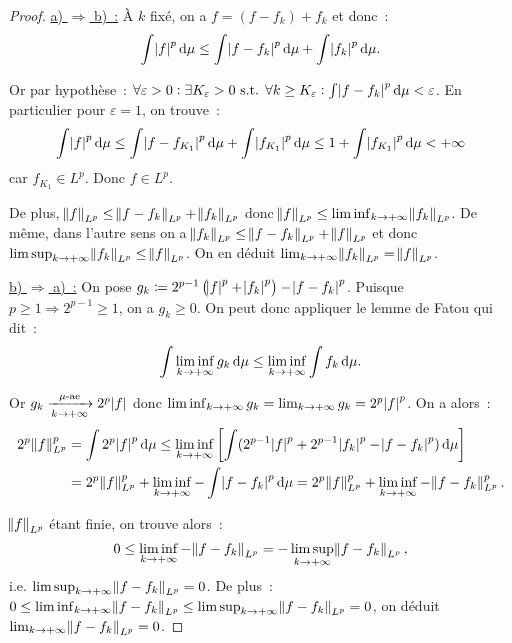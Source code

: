 \documentclass{article}
\theoremstyle{definition}
\newcommand{\pinfty}{{+\infty}}
\newcommand{\st}{\text{ s.t. }}
\begin{document}
\begin{proof} \underline {a) $\Rightarrow$ b)~:} À $k$ fixé, on a $f = (f-f_k) + f_k$ et donc~:
\[\int \abs f^p\dif\mu \leq \int\abs {f-f_k}^p\dif\mu + \int \abs {f_k}^p\dif\mu.\]

Or par hypothèse~: $\forall \varepsilon > 0 : \exists K_\varepsilon > 0 \st \forall k \geq K_\varepsilon : \int \abs {f-f_k}^p\dif\mu < \varepsilon$. En particulier
pour $\varepsilon = 1$, on trouve~:
\[\int \abs f^p\dif\mu \leq \int \abs {f-f_{K_1}}^p\dif\mu + \int\abs {f_{K_1}}^p\dif\mu \leq 1 + \int \abs{f_{K_1}}^p\dif\mu < \pinfty\]
car $f_{K_1} \in L^p$. Donc $f \in L^p$.

De plus, $\norm f_{L^p} \leq \norm {f-f_k}_{L^p} + \norm {f_k}_{L^p}$ donc $\norm f_{L^p} \leq \liminf_{k \to \pinfty}\norm {f_k}_{L^p}$. De même, dans l'autre sens on a
$\norm {f_k}_{L^p} \leq \norm {f-f_k}_{L^p} + \norm f_{L^p}$ et donc $\limsup_{k \to \pinfty}\norm {f_k}_{L^p} \leq \norm f_{L^p}$. On en déduit
$\lim_{k \to \pinfty}\norm {f_k}_{L^p} = \norm f_{L^p}$.

\underline {b) $\Rightarrow$ a)~:} On pose $g_k \coloneqq 2^{p-1}\left(\abs f^p + \abs {f_k}^p\right) - \abs {f-f_k}^p$.
Puisque $p \geq 1 \Rightarrow 2^{p-1} \geq 1$, on a $g_k \geq 0$. On peut donc appliquer le lemme de Fatou qui dit~:
\[\int\liminf_{k \to \pinfty}g_k\dif\mu \leq \liminf_{k \to \pinfty}\int f_k\dif\mu.\]

Or $g_k \xrightarrow[k \to \pinfty]{\mu\text{-ae}} 2^p\abs f$ donc $\liminf_{k \to \pinfty}g_k = \lim_{k \to \pinfty}g_k = 2^p\abs f^p$. On a alors~:
\begin{align*}
	2^p\norm f_{L^p}^p &= \int 2^p\abs f^p\dif\mu \leq \liminf_{k \to \pinfty}\left[\int (2^{p-1}\abs f^p + 2^{p-1}\abs {f_k}^p - \abs {f-f_k}^p)\dif\mu\right] \\
  	&= 2^p\norm f_{L^p}^p + \liminf_{k \to \pinfty}-\int\abs {f-f_k}^p\dif\mu = 2^p\norm f_{L^p}^p + \liminf_{k \to \pinfty}-\norm {f-f_k}_{L^p}^p.
\end{align*}

$\norm f_{L^p}$ étant finie, on trouve alors~:
\[0 \leq \liminf_{k \to \pinfty}-\norm {f-f_k}_{L^p} = -\limsup_{k \to \pinfty}\norm {f-f_k}_{L^p},\]
i.e. $\limsup_{k \to \pinfty}\norm {f-f_k}_{L^p} = 0$. De plus~: $0 \leq \liminf_{k \to \pinfty}\norm {f-f_k}_{L^p} \leq \limsup_{k \to \pinfty}\norm {f-f_k}_{L^p} = 0$,
on déduit $\lim_{k \to \pinfty}\norm {f-f_k}_{L^p} = 0$.
\end{proof}
\end{document}

